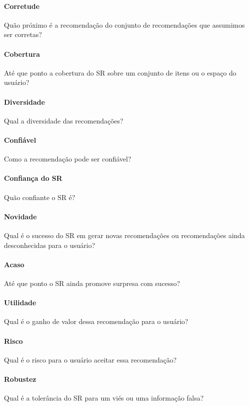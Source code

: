 \paragraph*{Corretude}
Quão próximo é a recomendação do conjunto de recomendações que assumimos ser corretas?

\paragraph*{Cobertura}
Até que ponto a cobertura do SR sobre um conjunto de itens ou o espaço do usuário?

\paragraph*{Diversidade}
Qual a diversidade das recomendações?

\paragraph*{Confiável}
Como a recomendação pode ser confiável?

\paragraph*{Confiança do SR}
Quão confiante o SR é?

\paragraph*{Novidade}
Qual é o sucesso do SR em gerar novas recomendações ou recomendações ainda desconhecidas para o usuário?

\paragraph*{Acaso}
Até que ponto o SR ainda promove surpresa com sucesso?

\paragraph*{Utilidade}
Qual é o ganho de valor dessa recomendação para o usuário?

\paragraph*{Risco}
Qual é o risco para o usuário aceitar essa recomendação?

\paragraph*{Robustez}
Qual é a tolerância do SR para um viés ou uma informação falsa?

